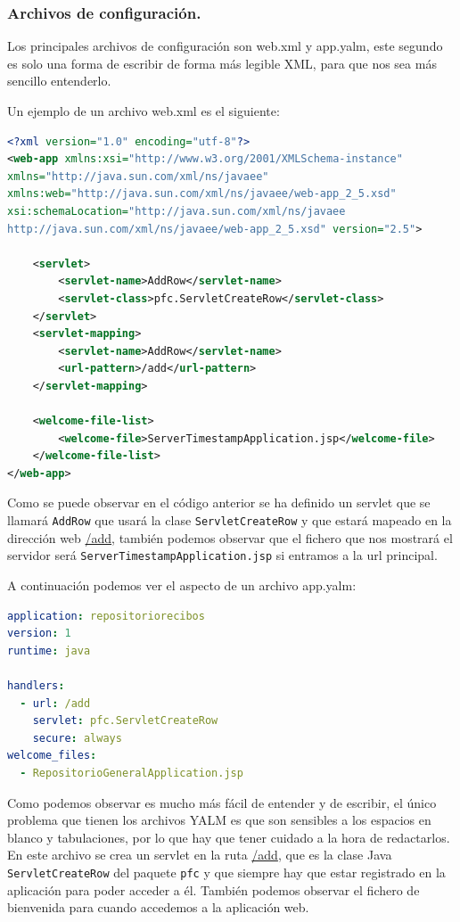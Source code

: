 \begin{itemize}
\subsubsection{Archivos de configuración.\label{cap:refArchivosConfiguracionGoogleAppEngine}}
Los principales archivos de configuración son web.xml y app.yalm, este segundo es solo una forma de escribir de forma más legible XML, para que nos sea más sencillo entenderlo.

Un ejemplo de un archivo web.xml es el siguiente:

\begin{lstlisting}[language=XML]
<?xml version="1.0" encoding="utf-8"?>
<web-app xmlns:xsi="http://www.w3.org/2001/XMLSchema-instance"
xmlns="http://java.sun.com/xml/ns/javaee"
xmlns:web="http://java.sun.com/xml/ns/javaee/web-app_2_5.xsd"
xsi:schemaLocation="http://java.sun.com/xml/ns/javaee
http://java.sun.com/xml/ns/javaee/web-app_2_5.xsd" version="2.5">

	<servlet>
		<servlet-name>AddRow</servlet-name>
		<servlet-class>pfc.ServletCreateRow</servlet-class>
	</servlet>
	<servlet-mapping>
		<servlet-name>AddRow</servlet-name>
		<url-pattern>/add</url-pattern>
	</servlet-mapping>

	<welcome-file-list>
		<welcome-file>ServerTimestampApplication.jsp</welcome-file>
	</welcome-file-list>
</web-app>
\end{lstlisting}

Como se puede observar en el código anterior se ha definido un servlet que se llamará \lstinline{AddRow} que usará la clase \lstinline{ServletCreateRow} y que estará mapeado en la dirección web \url{/add}, también podemos observar que el fichero que nos mostrará el servidor será \lstinline{ServerTimestampApplication.jsp} si entramos a la url principal.

A continuación podemos ver el aspecto de un archivo app.yalm:

\begin{lstlisting}[language=YAML]
application: repositoriorecibos
version: 1
runtime: java

handlers:
  - url: /add
    servlet: pfc.ServletCreateRow
    secure: always
welcome_files:
  - RepositorioGeneralApplication.jsp
\end{lstlisting}

Como podemos observar es mucho más fácil de entender y de escribir, el único problema que tienen los archivos YALM es que son sensibles a los espacios en blanco y tabulaciones, por lo que hay que tener cuidado a la hora de redactarlos. En este archivo se crea un servlet en la ruta \url{/add}, que es la clase Java \lstinline{ServletCreateRow} del paquete \lstinline{pfc} y que siempre hay que estar registrado en la aplicación para poder acceder a él. También podemos observar el fichero de bienvenida para cuando accedemos a la aplicación web. 


\end{itemize}
